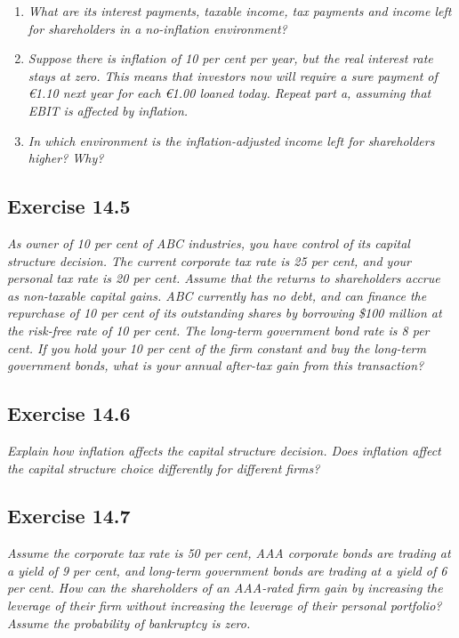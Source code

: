 \documentclass[]{book}
\newcommand{\euro}{€}
\theoremstyle{definition}
\theoremstyle{definition}
\theoremstyle{remark}
\begin{document}
\begin{enumerate}
\def\labelenumi{\alph{enumi}.}
\item
  \emph{What are its interest payments, taxable income, tax payments and
  income left for shareholders in a no-inflation environment?}
  \citep[p.492]{book}
\item
  \emph{Suppose there is inflation of 10 per cent per year, but the real
  interest rate stays at zero. This means that investors now will
  require a sure payment of \euro{}1.10 next year for each \euro{}1.00
  loaned today. Repeat part a, assuming that EBIT is affected by
  inflation.} \citep[p.492]{book}
\item
  \emph{In which environment is the inflation-adjusted income left for
  shareholders higher? Why?} \citep[p.493]{book}
\end{enumerate}

\subsection{Exercise 14.5}\label{exercise-14.5}

\emph{As owner of 10 per cent of ABC industries, you have control of its
capital structure decision. The current corporate tax rate is 25 per
cent, and your personal tax rate is 20 per cent. Assume that the returns
to shareholders accrue as non-taxable capital gains. ABC currently has
no debt, and can finance the repurchase of 10 per cent of its
outstanding shares by borrowing \$100 million at the risk-free rate of
10 per cent. The long-term government bond rate is 8 per cent. If you
hold your 10 per cent of the firm constant and buy the long-term
government bonds, what is your annual after-tax gain from this
transaction?} \citep[p.493]{book}

\subsection{Exercise 14.6}\label{exercise-14.6}

\emph{Explain how inflation affects the capital structure decision. Does
inflation affect the capital structure choice differently for different
firms?} \citep[p.493]{book}

\subsection{Exercise 14.7}\label{exercise-14.7}

\emph{Assume the corporate tax rate is 50 per cent, AAA corporate bonds
are trading at a yield of 9 per cent, and long-term government bonds are
trading at a yield of 6 per cent. How can the shareholders of an
AAA-rated firm gain by increasing the leverage of their firm without
increasing the leverage of their personal portfolio? Assume the
probability of bankruptcy is zero.} \citep[p.493]{book}
\end{document}
